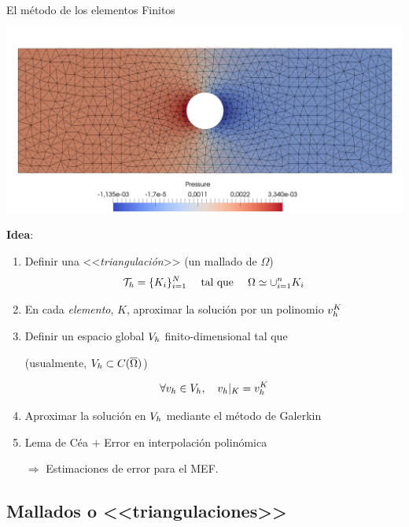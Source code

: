 \documentclass[10pt,leqno]{beamer}
\begin{document}
\begin{frame}{El método de los elementos Finitos}
  \vspace{-1.5em}
  \begin{flushright}
    \includegraphics[width=0.4\linewidth]{mef}
  \end{flushright}
  \vspace{-3em}

  {\large \textbf{Idea}}:
  \bigskip
  \begin{enumerate}\itemsep1em
  \item Definir una <<\alert{\textit{triangulación}}>> (un mallado de $\Omega$)
    $${\cal T}_h=\{K_i\}_{i=1}^N \quad\text{ tal que }\quad
    \Omega\simeq\cup_{i=1}^n K_i
    $$
  \item En cada \textit{elemento}, $K$, aproximar la solución por un
    \alert{polinomio $v_{h}^K$}
  \item Definir un \alert{espacio global $V_h$} finito-dimensional tal que
    \begin{flushright}
      \scriptsize (usualmente, $V_h\subset C(\overline\Omega)$)
    \end{flushright}
    $$
    \forall v_{h}\in V_h, \quad v_{h}|_K = v_{h}^K
    $$
  \item Aproximar la solución en $V_h$ mediante el método de \alert{Galerkin}

  \item Lema de Céa $+$ Error en interpolación polinómica
    \begin{flushright}
      $\Rightarrow$ \alert{Estimaciones de error} para el MEF.
    \end{flushright}
  \end{enumerate}
\end{frame}

\subsection{Mallados o <<triangulaciones>>}
\end{document}
